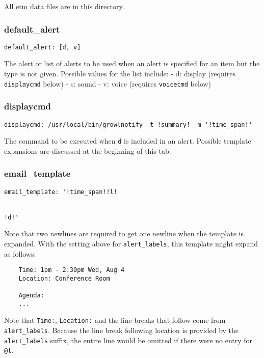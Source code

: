 \documentclass[]{article}
\begin{document}
All etm data files are in this directory.

\subsubsection{default\_alert}

\begin{verbatim}
default_alert: [d, v]
\end{verbatim}

The alert or list of alerts to be used when an alert is specified for an
item but the type is not given. Possible values for the list include: -
d: display (requires \texttt{displaycmd} below) - s: sound - v: voice
(requires \texttt{voicecmd} below)

\subsubsection{displaycmd}

\begin{verbatim}
displaycmd: /usr/local/bin/growlnotify -t !summary! -m '!time_span!'
\end{verbatim}

The command to be executed when \texttt{d} is included in an alert.
Possible template expansions are discussed at the beginning of this tab.

\subsubsection{email\_template}

\begin{verbatim}
email_template: '!time_span!!l!


!d!'
\end{verbatim}

Note that two newlines are required to get one newline when the template
is expanded. With the setting above for \texttt{alert\_labels}, this
template might expand as follows:

\begin{verbatim}
    Time: 1pm - 2:30pm Wed, Aug 4
    Location: Conference Room

    Agenda:
    ...
\end{verbatim}

Note that \texttt{Time:}, \texttt{Location:} and the line breaks that
follow come from \texttt{alert\_labels}. Because the line break
following location is provided by the \texttt{alert\_labels} suffix, the
entire line would be omitted if there were no entry for \texttt{@l}.
\end{document}

